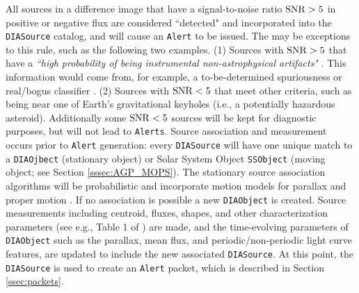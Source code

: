 All sources in a difference image that have a signal-to-noise ratio ${\rm SNR}>5$ in positive or negative flux are considered ``detected" and incorporated into the {\tt DIASource} catalog, and will cause an {\tt Alert} to be issued.
The may be exceptions to this rule, such as the following two examples.
(1) Sources with ${\rm SNR} > 5$ that have a {\it ``high probability of being instrumental non-astrophysical artifacts"} .
This information would come from, for example, a to-be-determined spuriousness or real/bogus classifier .
(2) Sources with ${\rm SNR} < 5$ that meet other criteria, such as being near one of Earth's gravitational keyholes (i.e., a potentially hazardous asteroid).
Additionally some ${\rm SNR} < 5$ sources will be kept for diagnostic purposes, but will not lead to {\tt Alerts}.
Source association and measurement occurs prior to {\tt Alert} generation: every {\tt DIASource} will have one unique match to a {\tt DIAOjbect} (stationary object) or Solar System Object {\tt SSObject} (moving object; see Section \ref{sssec:AGP_MOPS}).
The stationary source association algorithms will be probabilistic and incorporate motion models for parallax and proper motion .
If no association is possible a new {\tt DIAObject} is created.
Source measurements including centroid, fluxes, shapes, and other characterization parameters (see e.g., Table 1 of ) are made, and the time-evolving parameters of {\tt DIAObject} such as the parallax, mean flux, and periodic/non-periodic light curve features, are updated to include the new associated {\tt DIASource}.
At this point, the {\tt DIASource} is used to create an {\tt Alert} packet, which is described in Section \ref{ssec:packets}.

